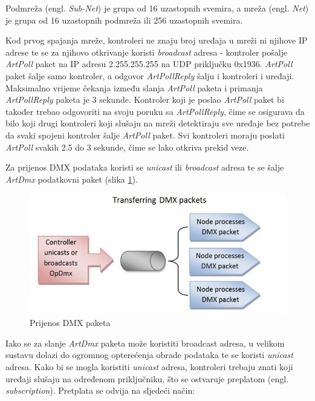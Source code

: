 \documentclass[times, utf8, zavrsni, numeric]{fer}
\begin{document}
Podmreža (engl. \emph{Sub-Net}) je grupa od 16 uzastopnih svemira, a mreža (engl. \emph{Net}) je grupa od 16 uzastopnih podmreža ili 256 uzastopnih svemira. \newline

Kod prvog spajanja mreže, kontroleri ne znaju broj uređaja u mreži ni njihove IP adrese te se za njihovo otkrivanje koristi \emph{broadcast} adresa - kontroler pošalje \emph{ArtPoll} paket na IP adresu 2.255.255.255 na UDP priključku 0x1936. \emph{ArtPoll} paket šalje samo kontroler, a odgovor \emph{ArtPollReply} šalju i kontroleri i uređaji. Maksimalno vrijeme čekanja između slanja \emph{ArtPoll} paketa i primanja \emph{ArtPollReply} paketa je 3 sekunde. Kontroler koji je poslao \emph{ArtPoll} paket bi također trebao odgovoriti na svoju poruku sa \emph{ArtPollReply}, čime se osigurava da bilo koji drugi kontroleri koji slušaju na mreži detektiraju sve uređaje bez potrebe da svaki spojeni kontroler šalje \emph{ArtPoll} paket. Svi kontroleri moraju poslati \emph{ArtPoll} svakih 2.5 do 3 sekunde, čime se lako otkriva prekid veze. \newline

Za prijenos DMX podataka koristi se \emph{unicast} ili \emph{broadcast} adresa te se šalje \emph{ArtDmx} podatkovni paket (slika \ref{fig:slika 3-4}).

\begin{figure}[htp]
	\centering
	\includegraphics[width=\linewidth]{slika 3-4.png}
	\caption{Prijenos DMX paketa \cite{streaming_packets}}
	\label{fig:slika 3-4}
\end{figure}

Iako se za slanje \emph{ArtDmx} paketa može koristiti broadcast adresa, u velikom sustavu dolazi do ogromnog opterećenja obrade podataka te se koristi \emph{unicast} adresa. Kako bi se mogla koristiti \emph{unicast} adresa, kontroleri trebaju znati  koji uređaji slušaju na određenom priključniku, što se ostvaruje preplatom (engl. \emph{subscription}). Pretplata se odvija na sljedeći način: \cite{subscription}
\end{document}
